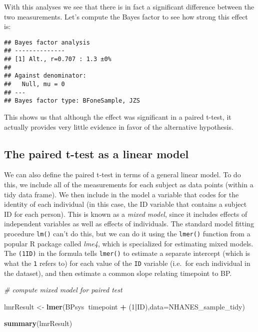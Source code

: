 \documentclass[]{book}
\newenvironment{Shaded}{\begin{snugshade}}{\end{snugshade}}
\newcommand{\KeywordTok}[1]{\textcolor[rgb]{0.13,0.29,0.53}{\textbf{#1}}}
\newcommand{\DataTypeTok}[1]{\textcolor[rgb]{0.13,0.29,0.53}{#1}}
\newcommand{\DecValTok}[1]{\textcolor[rgb]{0.00,0.00,0.81}{#1}}
\newcommand{\StringTok}[1]{\textcolor[rgb]{0.31,0.60,0.02}{#1}}
\newcommand{\CommentTok}[1]{\textcolor[rgb]{0.56,0.35,0.01}{\textit{#1}}}
\newcommand{\OtherTok}[1]{\textcolor[rgb]{0.56,0.35,0.01}{#1}}
\newcommand{\OperatorTok}[1]{\textcolor[rgb]{0.81,0.36,0.00}{\textbf{#1}}}
\newcommand{\NormalTok}[1]{#1}
\theoremstyle{definition}
\theoremstyle{definition}
\theoremstyle{definition}
\theoremstyle{remark}
\begin{document}
With this analyses we see that there is in fact a significant difference
between the two measurements. Let's compute the Bayes factor to see how
strong this effect is:

\begin{Shaded}
\end{Shaded}

\begin{verbatim}
## Bayes factor analysis
## --------------
## [1] Alt., r=0.707 : 1.3 ±0%
## 
## Against denominator:
##   Null, mu = 0 
## ---
## Bayes factor type: BFoneSample, JZS
\end{verbatim}

This shows us that although the effect was significant in a paired
t-test, it actually provides very little evidence in favor of the
alternative hypothesis.

\subsection{The paired t-test as a linear
model}\label{the-paired-t-test-as-a-linear-model}

We can also define the paired t-test in terms of a general linear model.
To do this, we include all of the measurements for each subject as data
points (within a tidy data frame). We then include in the model a
variable that codes for the identity of each individual (in this case,
the ID variable that contains a subject ID for each person). This is
known as a \emph{mixed model}, since it includes effects of independent
variables as well as effects of individuals. The standard model fitting
procedure \texttt{lm()} can't do this, but we can do it using the
\texttt{lmer()} function from a popular R package called \emph{lme4},
which is specialized for estimating mixed models. The
\texttt{(1\textbar{}ID)} in the formula tells \texttt{lmer()} to
estimate a separate intercept (which is what the \texttt{1} refers to)
for each value of the \texttt{ID} variable (i.e.~for each individual in
the dataset), and then estimate a common slope relating timepoint to BP.

\begin{Shaded}
\begin{Highlighting}[]
\CommentTok{# compute mixed model for paired test}

\NormalTok{lmrResult <-}\StringTok{ }\KeywordTok{lmer}\NormalTok{(BPsys}\OperatorTok{~}\NormalTok{timepoint }\OperatorTok{+}\StringTok{ }\NormalTok{(}\DecValTok{1}\OperatorTok{|}\NormalTok{ID),}\DataTypeTok{data=}\NormalTok{NHANES_sample_tidy)}

\KeywordTok{summary}\NormalTok{(lmrResult)}
\end{Highlighting}
\end{Shaded}
\end{document}

